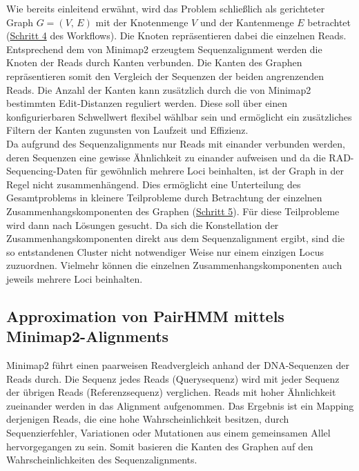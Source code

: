 Wie bereits einleitend erwähnt, wird das Problem schließlich als gerichteter Graph $G=(V, \, E)$ mit der Knotenmenge $V$ und der Kantenmenge $E$ betrachtet (\hyperref[step4]{Schritt 4\label{step4txt}} des Workflows). Die Knoten repräsentieren dabei die einzelnen Reads. Entsprechend dem von Minimap2 erzeugtem Sequenzalignment werden die Knoten der Reads durch Kanten verbunden. Die Kanten des Graphen repräsentieren somit den Vergleich der Sequenzen der beiden angrenzenden Reads. Die Anzahl der Kanten kann zusätzlich durch die von Minimap2 bestimmten Edit-Distanzen reguliert werden. Diese soll über einen konfigurierbaren Schwellwert flexibel wählbar sein und ermöglicht ein zusätzliches Filtern der Kanten zugunsten von  Laufzeit und Effizienz. \\

Da aufgrund des Sequenzalignments nur Reads mit einander verbunden werden, deren Sequenzen eine gewisse Ähnlichkeit zu einander aufweisen und da die RAD-Sequencing-Daten für gewöhnlich mehrere Loci beinhalten, ist der Graph in der Regel nicht zusammenhängend. Dies ermöglicht eine Unterteilung des Gesamtproblems in kleinere Teilprobleme durch Betrachtung der einzelnen Zusammenhangskomponenten des Graphen (\hyperref[step5]{Schritt 5\label{step5txt}}). Für diese Teilprobleme wird dann nach Lösungen gesucht. Da sich die Konstellation der Zusammenhangskomponenten direkt aus dem Sequenzalignment ergibt, sind die so entstandenen Cluster nicht notwendiger Weise nur einem einzigen Locus zuzuordnen. Vielmehr können die einzelnen Zusammenhangskomponenten auch jeweils mehrere Loci beinhalten. \\

\subsection{Approximation von PairHMM mittels Minimap2-Alignments} \label{subsec:phmm_minimap}

Minimap2 führt einen paarweisen Readvergleich anhand der DNA-Sequenzen der Reads durch. Die Sequenz jedes Reads (Querysequenz) wird mit jeder Sequenz der übrigen Reads (Referenzsequenz) verglichen. Reads mit hoher Ähnlichkeit zueinander werden in das Alignment aufgenommen. Das Ergebnis ist ein Mapping derjenigen Reads, die eine hohe Wahrscheinlichkeit besitzen, durch Sequenzierfehler, Variationen oder Mutationen aus einem gemeinsamen Allel hervorgegangen zu sein. Somit basieren die Kanten des Graphen auf den Wahrscheinlichkeiten des Sequenzalignments. \\

